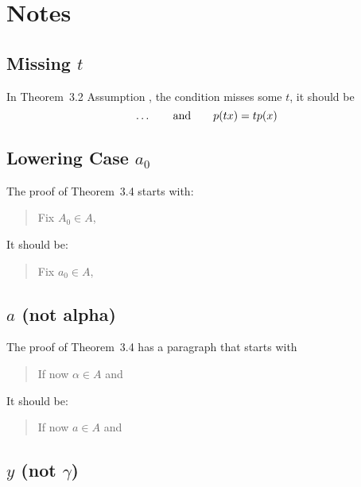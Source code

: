 
\section{Notes}

\subsection{Missing \texorpdfstring{$t$}{t}}

In Theorem~3.2 Assumption , the condition misses some $t$,
it should be
\begin{equation*}
\ldots \qquad\textnormal{and}\qquad p(tx) = tp(x)
\end{equation*}


\subsection{Lowering Case \texorpdfstring{$a_0$}{a0}}

The proof of Theorem~3.4 starts with:
\begin{quote}
 Fix \(A_0\in A\),
\end{quote}
It should be:
\begin{quote}
 Fix \(a_0\in A\),
\end{quote}


\subsection{\texorpdfstring{$a$}{a} (not alpha)}

The proof of Theorem~3.4 has a paragraph that starts with
\begin{quote}
If now \(\alpha\in A\) and
\end{quote}
It should be:
\begin{quote}
If now \(a\in A\) and
\end{quote}

\subsection{\texorpdfstring{$y$ (not $\gamma$)}{y (not gamma)}}

